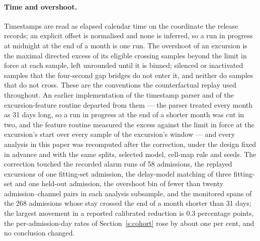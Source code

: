 \documentclass[11pt,letterpaper]{article}
\begin{document}
\paragraph{Time and overshoot.} Timestamps are read as elapsed calendar time on the coordinate the release records; an explicit offset is normalised and none is inferred, so a run in progress at midnight at the end of a month is one run. The overshoot of an excursion is the maximal directed excess of its eligible crossing samples beyond the limit in force at each sample, left unrounded until it is binned; silenced or inactivated samples that the four-second gap bridges do not enter it, and neither do samples that do not cross. These are the conventions the counterfactual replay used throughout. An earlier implementation of the timestamp parser and of the excursion-feature routine departed from them --- the parser treated every month as 31 days long, so a run in progress at the end of a shorter month was cut in two, and the feature routine measured the excess against the limit in force at the excursion's start over every sample of the excursion's window --- and every analysis in this paper was recomputed after the correction, under the design fixed in advance and with the same splits, selected model, cell-map rule and seeds. The correction touched the recorded alarm runs of 58 admissions, the replayed excursions of one fitting-set admission, the delay-model matching of three fitting-set and one held-out admission, the overshoot bin of fewer than twenty admission--channel pairs in each analysis subsample, and the monitored spans of the 268 admissions whose stay crossed the end of a month shorter than 31 days; the largest movement in a reported calibrated reduction is 0.3 percentage points, the per-admission-day rates of Section~\ref{s:cohort} rose by about one per cent, and no conclusion changed.

\end{document}
